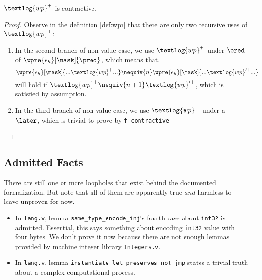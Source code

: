 \begin{lemma}
$\textlog{wp}^{+}$ is contractive.
\end{lemma}
\begin{proof}
  Observe in the definition \ref{def:wpr} that there are only two recursive uses of $\textlog{wp}^{+}$:
  \begin{enumerate}
    \item In the second branch of non-value case, we use $\textlog{wp}^{+}$ under $\pred$ of $\wpre{e_h}[\mask]{\pred}$,
    which means that, 
    \[\wpre{e_h}[\mask]{ ... \textlog{wp}^{+} ... } \nequiv{n} \wpre{e_h}[\mask]{ ... \textlog{wp}'^{+} ... } \]
    will hold if \( \textlog{wp}^{+} \nequiv{n + 1} \textlog{wp}'^{+} \), which is satisfied by assumption.
    \item In the third branch of non-value case, we use $\textlog{wp}^{+}$ under a $\later$, which is trivial to prove
    by \texttt{f\_contractive}.
  \end{enumerate}
\end{proof}

\subsection{Admitted Facts}

There are still one or more loopholes that exist behind the documented formalization.
But note that all of them are apparently true \emph{and} harmless to leave unproven for now.

\begin{itemize}
\item In \texttt{lang.v}, lemma \texttt{same\_type\_encode\_inj}'s fourth case about \texttt{int32} is admitted.
  Essential, this says something about encoding \texttt{int32} value with four bytes.
  We don't prove it now because there are not enough lemmas provided by machine integer library \texttt{Integers.v}.
\item In \texttt{lang.v}, lemma \texttt{instantiate\_let\_preserves\_not\_jmp} states a trivial truth about a complex
  computational process.
\end{itemize}
